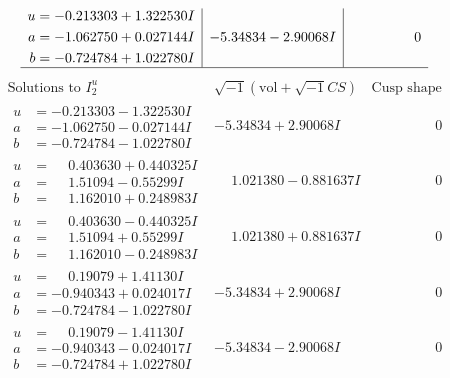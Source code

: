 \documentclass[1p]{elsarticle_modified}
\theoremstyle{definition}
\newcommand{\I}{\sqrt{-1}}
\begin{document}
$$\begin{array}{c|c|c}
\begin{aligned}
u &= -0.213303 + 1.322530 I \\
a &= -1.062750 + 0.027144 I \\
b &= -0.724784 + 1.022780 I\end{aligned}
 & -5.34834 - 2.90068 I & \phantom{-0.000000 } 0\\
 \hline 
 \end{array}$$\newpage$$\begin{array}{c|c|c}  
\text{Solutions to }I^u_{2}& \I (\text{vol} + \sqrt{-1}CS) & \text{Cusp shape}\\
 \hline 
\begin{aligned}
u &= -0.213303 - 1.322530 I \\
a &= -1.062750 - 0.027144 I \\
b &= -0.724784 - 1.022780 I\end{aligned}
 & -5.34834 + 2.90068 I & \phantom{-0.000000 } 0 \\ \hline\begin{aligned}
u &= \phantom{-}0.403630 + 0.440325 I \\
a &= \phantom{-}1.51094 - 0.55299 I \\
b &= \phantom{-}1.162010 + 0.248983 I\end{aligned}
 & \phantom{-}1.021380 - 0.881637 I & \phantom{-0.000000 } 0 \\ \hline\begin{aligned}
u &= \phantom{-}0.403630 - 0.440325 I \\
a &= \phantom{-}1.51094 + 0.55299 I \\
b &= \phantom{-}1.162010 - 0.248983 I\end{aligned}
 & \phantom{-}1.021380 + 0.881637 I & \phantom{-0.000000 } 0 \\ \hline\begin{aligned}
u &= \phantom{-}0.19079 + 1.41130 I \\
a &= -0.940343 + 0.024017 I \\
b &= -0.724784 - 1.022780 I\end{aligned}
 & -5.34834 + 2.90068 I & \phantom{-0.000000 } 0 \\ \hline\begin{aligned}
u &= \phantom{-}0.19079 - 1.41130 I \\
a &= -0.940343 - 0.024017 I \\
b &= -0.724784 + 1.022780 I\end{aligned}
 & -5.34834 - 2.90068 I & \phantom{-0.000000 } 0 \\ \hline\begin{aligned}

\end{aligned}
\end{array}$$
\end{document}
